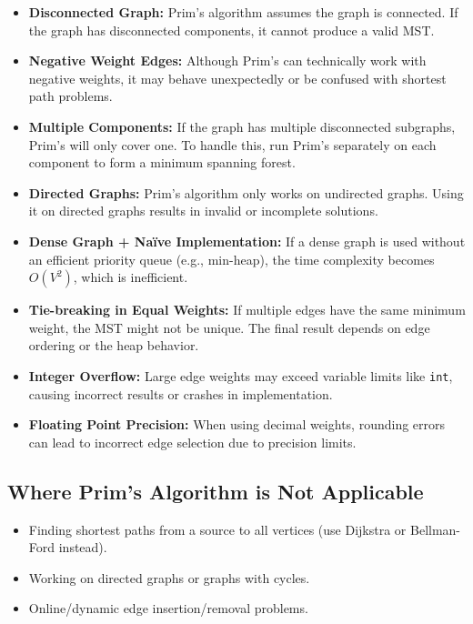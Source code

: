 \documentclass[a4paper,14pt]{extarticle}
\begin{document}
\begin{itemize}
    \item \textbf{Disconnected Graph:} Prim’s algorithm assumes the graph is connected. If the graph has disconnected components, it cannot produce a valid MST.
    
    \item \textbf{Negative Weight Edges:} Although Prim’s can technically work with negative weights, it may behave unexpectedly or be confused with shortest path problems.
    
    \item \textbf{Multiple Components:} If the graph has multiple disconnected subgraphs, Prim's will only cover one. To handle this, run Prim’s separately on each component to form a minimum spanning forest.
    
    \item \textbf{Directed Graphs:} Prim’s algorithm only works on undirected graphs. Using it on directed graphs results in invalid or incomplete solutions.
    
    \item \textbf{Dense Graph + Naïve Implementation:} If a dense graph is used without an efficient priority queue (e.g., min-heap), the time complexity becomes \(O(V^2)\), which is inefficient.
    
    \item \textbf{Tie-breaking in Equal Weights:} If multiple edges have the same minimum weight, the MST might not be unique. The final result depends on edge ordering or the heap behavior.
    
    \item \textbf{Integer Overflow:} Large edge weights may exceed variable limits like \texttt{int}, causing incorrect results or crashes in implementation.
    
    \item \textbf{Floating Point Precision:} When using decimal weights, rounding errors can lead to incorrect edge selection due to precision limits.
\end{itemize}

\vspace{1em}

\subsection{Where Prim's Algorithm is Not Applicable}
\begin{itemize}
    \item Finding shortest paths from a source to all vertices (use Dijkstra or Bellman-Ford instead).
    \item Working on directed graphs or graphs with cycles.
    \item Online/dynamic edge insertion/removal problems.
\end{itemize}
\end{document}
